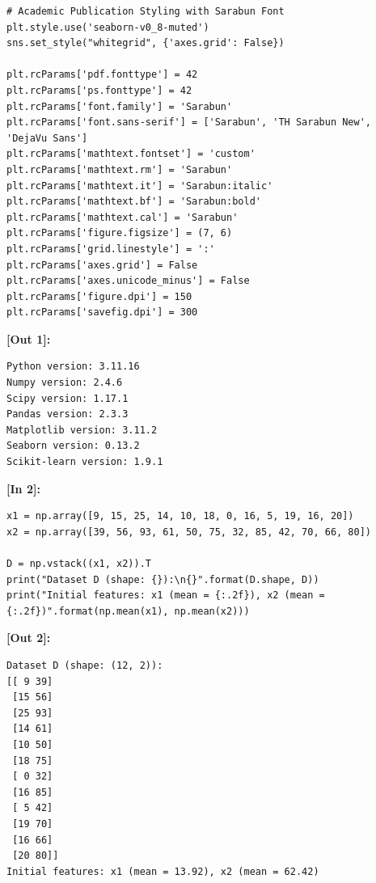 \begin{lstlisting}[style=pycode]
# Academic Publication Styling with Sarabun Font
plt.style.use('seaborn-v0_8-muted')
sns.set_style("whitegrid", {'axes.grid': False})

plt.rcParams['pdf.fonttype'] = 42
plt.rcParams['ps.fonttype'] = 42
plt.rcParams['font.family'] = 'Sarabun'
plt.rcParams['font.sans-serif'] = ['Sarabun', 'TH Sarabun New', 'DejaVu Sans']
plt.rcParams['mathtext.fontset'] = 'custom'
plt.rcParams['mathtext.rm'] = 'Sarabun'
plt.rcParams['mathtext.it'] = 'Sarabun:italic'
plt.rcParams['mathtext.bf'] = 'Sarabun:bold'
plt.rcParams['mathtext.cal'] = 'Sarabun'
plt.rcParams['figure.figsize'] = (7, 6)
plt.rcParams['grid.linestyle'] = ':'
plt.rcParams['axes.grid'] = False
plt.rcParams['axes.unicode_minus'] = False
plt.rcParams['figure.dpi'] = 150
plt.rcParams['savefig.dpi'] = 300
\end{lstlisting}
\noindent\textbf{\small [Out 1]:}
\begin{lstlisting}[style=output]
Python version: 3.11.16
Numpy version: 2.4.6
Scipy version: 1.17.1
Pandas version: 2.3.3
Matplotlib version: 3.11.2
Seaborn version: 0.13.2
Scikit-learn version: 1.9.1
\end{lstlisting}

\vspace{0.6em}
\noindent\textbf{\small [In 2]:}
\begin{lstlisting}[style=pycode]
x1 = np.array([9, 15, 25, 14, 10, 18, 0, 16, 5, 19, 16, 20])
x2 = np.array([39, 56, 93, 61, 50, 75, 32, 85, 42, 70, 66, 80])

D = np.vstack((x1, x2)).T 
print("Dataset D (shape: {}):\n{}".format(D.shape, D))
print("Initial features: x1 (mean = {:.2f}), x2 (mean = {:.2f})".format(np.mean(x1), np.mean(x2)))
\end{lstlisting}
\noindent\textbf{\small [Out 2]:}
\begin{lstlisting}[style=output]
Dataset D (shape: (12, 2)):
[[ 9 39]
 [15 56]
 [25 93]
 [14 61]
 [10 50]
 [18 75]
 [ 0 32]
 [16 85]
 [ 5 42]
 [19 70]
 [16 66]
 [20 80]]
Initial features: x1 (mean = 13.92), x2 (mean = 62.42)
\end{lstlisting}


